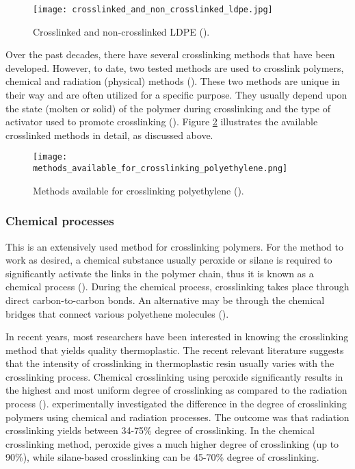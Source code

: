 \begin{figure}[H]
    \centering
    \texttt{[image: crosslinked\_and\_non\_crosslinked\_ldpe.jpg]}
    \caption{Crosslinked and non-crosslinked LDPE (\cite{kurtz2009cross}).}
    \label{ch3:figure:ldpe}
\end{figure}

Over the past decades, there have several crosslinking methods that have been developed. However, to date, two tested methods are used to crosslink polymers, chemical and radiation (physical) methods (\cite{clemens2017microstructure, bajaj2020steels}). These two methods are unique in their way and are often utilized for a specific purpose. They usually depend upon the state (molten or solid) of the polymer during crosslinking and the type of activator used to promote crosslinking (\cite{kurtz2009cross}). Figure \ref{ch3:figure:crosslinking_methods} illustrates the available crosslinked methods in detail, as discussed above.

\begin{figure}[H]
    \centering
    \texttt{[image: methods\_available\_for\_crosslinking\_polyethylene.png]}
    \caption{Methods available for crosslinking polyethylene (\cite{patterson2022cross}).}
    \label{ch3:figure:crosslinking_methods}
\end{figure}

\subsubsection{Chemical processes}
This is an extensively used method for crosslinking polymers. For the method to work as desired, a chemical substance usually peroxide or silane is required to significantly activate the links in the polymer chain, thus it is known as a chemical process (\cite{peacock2000handbook}). During the chemical process, crosslinking takes place through direct carbon-to-carbon bonds. An alternative may be through the chemical bridges that connect various polyethene molecules (\cite{kurtz2009cross}). 

In recent years, most researchers have been interested in knowing the crosslinking method that yields quality thermoplastic. The recent relevant literature suggests that the intensity of crosslinking in thermoplastic resin usually varies with the crosslinking process. Chemical crosslinking using peroxide significantly results in the highest and most uniform degree of crosslinking as compared to the radiation process (\cite{clemens2017microstructure, bajaj2020steels}). \cite{peacock2000handbook} experimentally investigated the difference in the degree of crosslinking polymers using chemical and radiation processes. The outcome was that radiation crosslinking yields between 34-75\% degree of crosslinking. In the chemical crosslinking method, peroxide gives a much higher degree of crosslinking (up to 90\%), while silane-based crosslinking can be 45-70\% degree of crosslinking.

